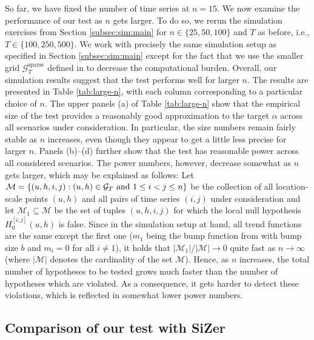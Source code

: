 \documentclass[12pt]{article}
\makeatletter
\renewcommand{\eqref}[1]{\tagform@{\ref{#1}}}
\makeatother
\begin{document}
So far, we have fixed the number of time series at $n = 15$. We now examine the performance of our test as $n$ gets larger. To do so, we rerun the simulation exercises from Section \ref{subsec:sim:main} for $n \in \{25,50,100\}$ and $T$ as before, i.e., $T \in \{100,250,500\}$. We work with precisely the same simulation setup as specified in Section \ref{subsec:sim:main} except for the fact that we use the smaller grid $\mathcal{G}_T^{\text{sparse}}$ defined in \eqref{eq:grid-sparse} to decrease the computational burden. Overall, our simulation results suggest that the test performs well for larger $n$. The results are presented in Table \ref{tab:large-n}, with each column corresponding to a particular choice of $n$. 
The upper panels (a) of Table \ref{tab:large-n} show that the empirical size of the test provides a reasonably good approximation to the target $\alpha$ across all scenarios under consideration. In particular, the size numbers remain fairly stable as $n$ increases, even though they appear to get a little less precise for larger $n$. 
Panels (b)--(d) further show that the test has reasonable power across all considered scenarios. The power numbers, however, decrease somewhat as $n$ gets larger, which may be explained as follows: Let $\mathcal{M} = \{ (u,h,i,j): (u,h) \in \mathcal{G}_T \text{ and } 1 \le i < j \le n \}$ be the collection of all location-scale points $(u,h)$ and all pairs of time series $(i,j)$ under consideration and let $\mathcal{M}_1 \subseteq \mathcal{M}$ be the set of tuples $(u,h,i,j)$ for which the local null hypothesis $H_0^{[i, j]}(u, h)$ is false. Since in the simulation setup at hand, all trend functions are the same except the first one ($m_1$ being the bump function from \eqref{eq:bump-fct} with bump size $b$ and $m_i = 0$ for all $i \ne 1$), it holds that $|\mathcal{M}_1| / |\mathcal{M}| \to 0$ quite fast as $n \to \infty$ (where $| \mathcal{M} |$ denotes the cardinality of the set $\mathcal{M}$). Hence, as $n$ increases, the total number of hypotheses to be tested grows much faster than the number of hypotheses which are violated. As a consequence, it gets harder to detect these violations, which is reflected in somewhat lower power numbers. 


\subsection{Comparison of our test with SiZer} 
\end{document}
